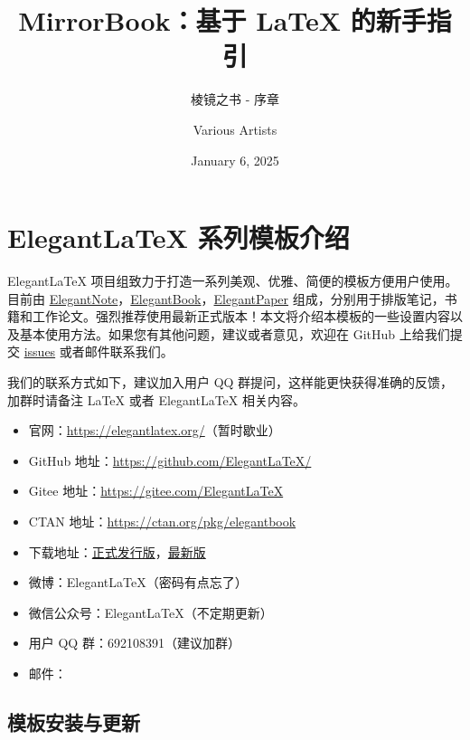 \documentclass[lang=cn,10pt]{elegantbook}
\title{MirrorBook：基于 \LaTeX{} 的新手指引}
\subtitle{棱镜之书 - 序章}
\author{Various Artists}
\institute{Mirror\LaTeX{} Program}
\date{January 6, 2025}
\begin{document}
\maketitle
\frontmatter

\tableofcontents

\mainmatter

\chapter{Elegant\LaTeX{} 系列模板介绍}

Elegant\LaTeX{} 项目组致力于打造一系列美观、优雅、简便的模板方便用户使用。目前由 \href{https://github.com/ElegantLaTeX/ElegantNote}{ElegantNote}，\href{https://github.com/ElegantLaTeX/ElegantBook}{ElegantBook}，\href{https://github.com/ElegantLaTeX/ElegantPaper}{ElegantPaper} 组成，分别用于排版笔记，书籍和工作论文。强烈推荐使用最新正式版本！本文将介绍本模板的一些设置内容以及基本使用方法。如果您有其他问题，建议或者意见，欢迎在 GitHub 上给我们提交 \href{https://github.com/ElegantLaTeX/ElegantBook/issues}{issues} 或者邮件联系我们。

我们的联系方式如下，建议加入用户 QQ 群提问，这样能更快获得准确的反馈，加群时请备注 \LaTeX{} 或者 Elegant\LaTeX{} 相关内容。
\begin{itemize}
  \item 官网：\href{https://elegantlatex.org/}{https://elegantlatex.org/}（暂时歇业）
  \item GitHub 地址：\href{https://github.com/ElegantLaTeX/}{https://github.com/ElegantLaTeX/}
  \item Gitee 地址：\href{https://gitee.com/ElegantLaTeX}{https://gitee.com/ElegantLaTeX}
  \item CTAN 地址：\href{https://ctan.org/pkg/elegantbook}{https://ctan.org/pkg/elegantbook}
  \item 下载地址：\href{https://github.com/ElegantLaTeX/ElegantBook/releases}{正式发行版}，\href{https://github.com/ElegantLaTeX/ElegantBook/archive/master.zip}{最新版}
  \item 微博：Elegant\LaTeX{}（密码有点忘了）
  \item 微信公众号：Elegant\LaTeX{}（不定期更新）
  \item 用户 QQ 群：692108391（建议加群）
  \item 邮件：
\end{itemize}

\section{模板安装与更新}
\end{document}
